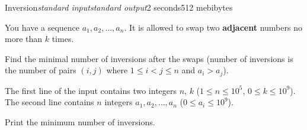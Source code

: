 \begin{problem}{Inversion}{\textsl{standard input}}{\textsl{standard output}}{2 seconds}{512 mebibytes}{}

You have a sequence $a_1, a_2, \dots, a_n$. It is allowed to swap two
\textbf{adjacent} numbers no more than $k$ times.

Find the minimal number of inversions after the swaps (number of inversions is the number of pairs $(i, j)$ where
$1 \leq i < j \leq n$ and $a_i > a_j$).

\InputFile

The first line of the input contains two integers $n$, $k$
($1 \leq n \leq 10^5$, $0 \leq k \leq 10^9$). The second line contains $n$
integers $a_1, a_2, \dots, a_n$ ($0 \leq a_i \leq 10^9$).

\OutputFile

Print the minimum number of inversions.

\Examples

\begin{example}%
%
%
\end{example}
\end{problem}
